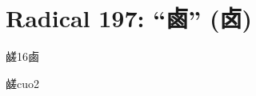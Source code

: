 
\section*{Radical 197: ``⿄'' (卤)}

\begin{entry}{鹾}{16}{⿄}
  \begin{phonetics}{鹾}{cuo2}
  \end{phonetics}
\end{entry}


